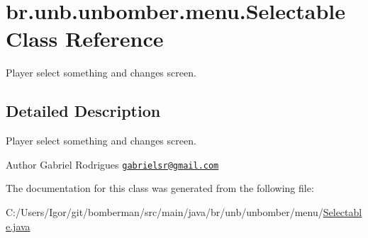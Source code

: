 \hypertarget{classbr_1_1unb_1_1unbomber_1_1menu_1_1_selectable}{\section{br.\+unb.\+unbomber.\+menu.\+Selectable Class Reference}
\label{classbr_1_1unb_1_1unbomber_1_1menu_1_1_selectable}
}


Player select something and changes screen.  




\subsection{Detailed Description}
Player select something and changes screen. 

\begin{DoxyAuthor}{Author}
Gabriel Rodrigues \href{mailto:gabrielsr@gmail.com}{\tt gabrielsr@gmail.\+com} 
\end{DoxyAuthor}


The documentation for this class was generated from the following file\+:\begin{DoxyCompactItemize}
\item 
C\+:/\+Users/\+Igor/git/bomberman/src/main/java/br/unb/unbomber/menu/\hyperlink{_selectable_8java}{Selectable.\+java}\end{DoxyCompactItemize}
